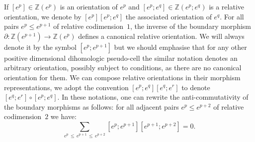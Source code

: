 \documentclass[10pt]{amsart}
\theoremstyle{definition}
\numberwithin{equation}{section}
\numberwithin{figure}{section}
\newcommand{\Z}{\mathbb{Z}}
\begin{document}
If $[e^p]\in\Z(e^p)$ is an orientation of $e^p$ and $[e^p;e^q]\in\Z(e^p;e^q)$ is a relative orientation, we denote by $[e^p][e^p;e^q]$ the associated orientation of $e^q$. For all pairs $e^p\leq e^{p+1}$ of relative codimension~$1$, the inverse of the boundary morphism $\partial : \Z(e^{p+1})\rightarrow\Z(e^{p})$ defines a canonical relative orientation. We will always denote it by the symbol $[e^p;e^{p+1}]$ but we should emphasise that for any other positive dimensional dihomologic pseudo-cell the similar notation denotes an arbitrary orientation, possibly subject to conditions, as there are no canonical orientation for them. We can compose relative orientations in their morphism representations, we adopt the convention $[e^p;e^q][e^q;e^r]$ to denote $[e^q;e^r]\circ[e^p;e^q]$. In these notations, one can rewrite the anti-commutativity of the boundary morphisms as follows: for all adjacent pairs $e^p\leq e^{p+2}$ of relative codimension~$2$ we have:
\begin{equation*}
\sum_{e^p\,\leq\,e^{p+1}\,\leq\,e^{p+2}}\left[e^p;e^{p+1}\right]\left[e^{p+1};e^{p+2}\right]=0.
\end{equation*}
\end{document}
